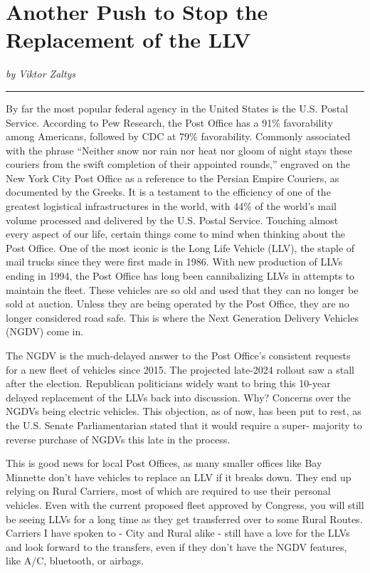 \documentclass[
]{book}
\begin{document}
\section*{Another Push to Stop the Replacement of the LLV}\label{another-push-to-stop-the-replacement-of-the-llv}

\emph{by Viktor Zaltys}

\begin{center}\rule{0.5\linewidth}{0.5pt}\end{center}

By far the most popular federal agency in the United States is the U.S. Postal Service. According to Pew Research, the Post Office has a 91\% favorability among Americans, followed by CDC at 79\% favorability. Commonly associated with the phrase ``Neither snow nor rain nor heat nor gloom of night stays these couriers from the swift completion of their appointed rounds,'' engraved on the New York City Post Office as a reference to the Persian Empire Couriers, as documented by the Greeks. It is a testament to the efficiency of one of the greatest logistical infrastructures in the world, with 44\% of the world's mail volume processed and delivered by the U.S. Postal Service. Touching almost every aspect of our life, certain things come to mind when thinking about the Post Office. One of the most iconic is the Long Life Vehicle (LLV), the staple of mail trucks since they were first made in 1986. With new production of LLVs ending in 1994, the Post Office has long been cannibalizing LLVs in attempts to maintain the fleet. These vehicles are so old and used that they can no longer be sold at auction. Unless they are being operated by the Post Office, they are no longer considered road safe. This is where the Next Generation Delivery Vehicles (NGDV) come in.

The NGDV is the much-delayed answer to the Post Office's consistent requests for a new fleet of vehicles since 2015. The projected late-2024 rollout saw a stall after the election. Republican politicians widely want to bring this 10-year delayed replacement of the LLVs back into discussion. Why? Concerns over the NGDVs being electric vehicles. This objection, as of now, has been put to rest, as the U.S. Senate Parliamentarian stated that it would require a super- majority to reverse purchase of NGDVs this late in the process.

This is good news for local Post Offices, as many smaller offices like Bay Minnette don't have vehicles to replace an LLV if it breaks down. They end up relying on Rural Carriers, most of which are required to use their personal vehicles. Even with the current proposed fleet approved by Congress, you will still be seeing LLVs for a long time as they get transferred over to some Rural Routes. Carriers I have spoken to - City and Rural alike - still have a love for the LLVs and look forward to the transfers, even if they don't have the NGDV features, like A/C, bluetooth, or airbags.
\end{document}
